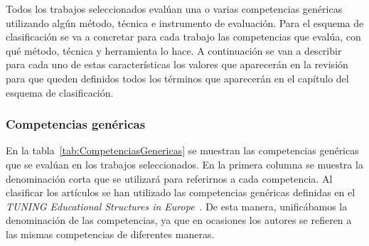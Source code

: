 
Todos los trabajos seleccionados evalúan una o varias competencias genéricas utilizando algún método, técnica e instrumento de evaluación. Para el esquema de clasificación se va a concretar para cada trabajo las competencias que evalúa, con qué método, técnica y herramienta lo hace. A continuación se van a describir para cada uno de estas características los valores que aparecerán en la revisión para que queden definidos todos los términos que aparecerán en el capítulo del esquema de clasificación.

\subsubsection{Competencias genéricas}

En la tabla~\ref{tab:CompetenciasGenericas} se muestran las competencias genéricas que se evalúan en los trabajos seleccionados. En la primera columna se muestra la denominación corta que se utilizará para referirnos a cada competencia. Al clasificar los artículos se han utilizado las competencias genéricas definidas en el \emph{TUNING Educational Structures in Europe}~\cite{gonzalez2003tuning}. De esta manera, unificábamos la denominación de las competencias, ya que en ocasiones los autores se refieren a las mismas competencias de diferentes maneras.

